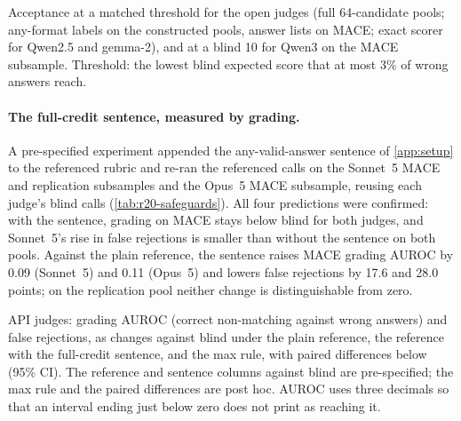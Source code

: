 \begin{table}[htbp]
\centering
\caption{Acceptance at a matched threshold for the open judges (full 64-candidate pools; any-format labels on the constructed pools, answer lists on \textsc{MACE}; exact scorer for Qwen2.5 and gemma-2), and at a blind 10 for Qwen3 on the \textsc{MACE} subsample. Threshold: the lowest blind expected score that at most 3\% of wrong answers reach.\ph}
\label{tab:r20-matched}
\footnotesize
\setlength{\tabcolsep}{2.6pt}

\end{table}

\paragraph{The full-credit sentence, measured by grading.}
A pre-specified experiment appended the any-valid-answer sentence of \cref{app:setup} to the referenced rubric and re-ran the referenced calls on the Sonnet~5 \textsc{MACE} and replication subsamples and the Opus~5 \textsc{MACE} subsample, reusing each judge's blind calls (\cref{tab:r20-safeguards}). All four predictions were confirmed: with the sentence, grading on \textsc{MACE} stays below blind for both judges, and Sonnet~5's rise in false rejections is smaller than without the sentence on both pools. Against the plain reference, the sentence raises \textsc{MACE} grading AUROC by 0.09 (Sonnet~5) and 0.11 (Opus~5) and lowers false rejections by 17.6 and 28.0 points; on the replication pool neither change is distinguishable from zero.\ph{}

\begin{table}[htbp]
\centering
\caption{API judges: grading AUROC (correct non-matching against wrong answers) and false rejections, as changes against blind under the plain reference, the reference with the full-credit sentence, and the max rule, with paired differences below (95\% CI). The reference and sentence columns against blind are pre-specified; the max rule and the paired differences are post hoc. AUROC uses three decimals so that an interval ending just below zero does not print as reaching it.}
\label{tab:r20-safeguards}
\footnotesize
\begin{adjustbox}{max width=\linewidth}\end{adjustbox}
\end{table}

